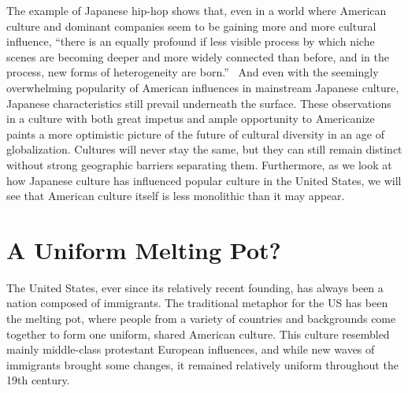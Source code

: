 \documentclass[12pt]{article}
\begin{document}
The example of Japanese hip-hop shows that, even in a world where American culture and dominant companies seem to be gaining more and more cultural influence, ``there is an equally profound if less visible process by which niche scenes are becoming deeper and more widely connected than before, and in the process, new forms of heterogeneity are born.''~\cHopGlob{\citep[pg.\ 385]}
And even with the seemingly overwhelming popularity of American influences in mainstream Japanese culture, Japanese characteristics still prevail underneath the surface.  These observations in a culture with both great impetus and ample opportunity to Americanize paints a more optimistic picture of the future of cultural diversity in an age of globalization.  Cultures will never stay the same, but they can still remain distinct without strong geographic barriers separating them.  Furthermore, as we look at how Japanese culture has influenced popular culture in the United States, we will see that American culture itself is less monolithic than it may appear.

\section{A Uniform Melting Pot?}

The United States, ever since its relatively recent founding, has always been a nation composed of immigrants.  The traditional metaphor for the US has been the melting pot, where people from a variety of countries and backgrounds come together to form one uniform, shared American culture.  This culture resembled mainly middle-class protestant European influences, and while new waves of immigrants brought some changes, it remained relatively uniform throughout the 19th century.
\end{document}
